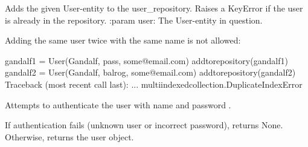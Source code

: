 \documentclass[letterpaper,10pt,english]{sphinxmanual}
\begin{document}
\begin{fulllineitems}
\label{\detokenize{pydash_app.user:pydash_app.user.add_to_repository}}
Adds the given User-entity to the user\_repository. Raises a KeyError if the user is already in the repository.
:param user: The User-entity in question.

Adding the same user twice with the same name is not allowed:

%
\begin{sphinxVerbatim}[commandchars=\\\{\}]
\PYGZgt{}\PYGZgt{}\PYGZgt{} gandalf1 = User(\PYGZdq{}Gandalf\PYGZdq{}, \PYGZdq{}pass\PYGZdq{}, \PYGZsq{}some@email.com\PYGZsq{})
\PYGZgt{}\PYGZgt{}\PYGZgt{} add\PYGZus{}to\PYGZus{}repository(gandalf1)
\PYGZgt{}\PYGZgt{}\PYGZgt{} gandalf2 = User(\PYGZdq{}Gandalf\PYGZdq{}, \PYGZdq{}balrog\PYGZdq{}, \PYGZsq{}some@email.com\PYGZsq{})
\PYGZgt{}\PYGZgt{}\PYGZgt{} add\PYGZus{}to\PYGZus{}repository(gandalf2)
Traceback (most recent call last):
  ...
multi\PYGZus{}indexed\PYGZus{}collection.DuplicateIndexError
\end{sphinxVerbatim}

\end{fulllineitems}


\begin{fulllineitems}
\label{\detokenize{pydash_app.user:pydash_app.user.authenticate}}
Attempts to authenticate the user with name 
and password .

If authentication fails (unknown user or incorrect password), returns None.
Otherwise, returns the user object.

\end{fulllineitems}


\begin{fulllineitems}
\label{\detokenize{pydash_app.user:pydash_app.user.check_password_requirements}}
\end{fulllineitems}
\end{document}
